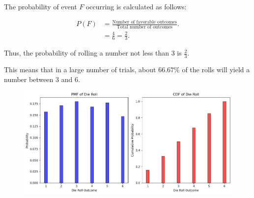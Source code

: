 \documentclass[journal]{IEEEtran}
\begin{document}
The probability of event \( F \) occurring is calculated as follows:

\begin{align}
    P(F) &= \frac{\text{Number of favorable outcomes}}{\text{Total number of outcomes}}. \\
         &= \frac{4}{6} = \frac{2}{3}.
\end{align}

Thus, the probability of rolling a number not less than 3 is \( \frac{2}{3} \).

This means that in a large number of trials, about \( 66.67\% \) of the rolls will yield a number between 3 and 6.
\begin{figure}[h]
    \centering
    \includegraphics[width=\textwidth]{figs/fig.png}
\end{figure}
\end{document}
